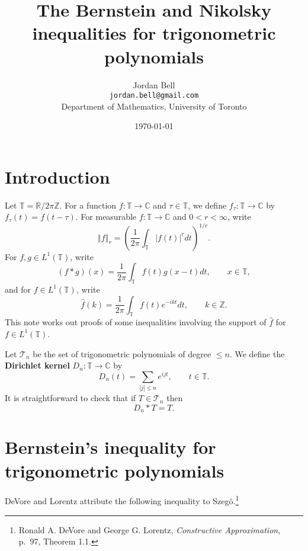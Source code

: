 \documentclass{article}
\newcommand{\norm}[1]{\left\Vert #1 \right\Vert}
\theoremstyle{definition}
\begin{document}
\title{The Bernstein and Nikolsky inequalities for trigonometric polynomials}
\author{Jordan Bell\\ \texttt{jordan.bell@gmail.com}\\Department of Mathematics, University of Toronto}
\date{\today}

\maketitle

\section{Introduction}
Let $\mathbb{T}=\mathbb{R}/2\pi \mathbb{Z}$. For a function $f:\mathbb{T} \to \mathbb{C}$ and $\tau \in \mathbb{T}$, we define
$f_\tau:\mathbb{T} \to \mathbb{C}$ by $f_\tau(t)=f(t-\tau)$.
For measurable $f:\mathbb{T} \to \mathbb{C}$ and $0<r<\infty$, write
\[
\norm{f}_r = \left(\frac{1}{2\pi} \int_{\mathbb{T}} |f(t)|^r dt\right)^{1/r}.
\]
For $f,g \in L^1(\mathbb{T})$, write
\[
(f*g)(x) = \frac{1}{2\pi} \int_{\mathbb{T}} f(t)g(x-t) dt, \qquad x \in \mathbb{T},
\]
and for $f \in L^1(\mathbb{T})$, write
\[
\hat{f}(k)=\frac{1}{2\pi} \int_{\mathbb{T}} f(t) e^{-ikt} dt, \qquad k \in \mathbb{Z}.
\]
This note works out proofs of some inequalities involving the support of  $\hat{f}$ for
$f \in L^1(\mathbb{T})$.



Let $\mathscr{T}_n$ be the set of trigonometric polynomials of degree $\leq n$. 
We define the \textbf{Dirichlet kernel} $D_n:\mathbb{T} \to \mathbb{C}$ by
\[
D_n(t) = \sum_{|j| \leq n} e^{ijt}, \qquad t \in \mathbb{T}.
\]
It is straightforward to check that if $T \in \mathscr{T}_n$ then 
\[
D_n * T = T.
\]



\section{Bernstein's inequality for trigonometric polynomials}
DeVore and Lorentz attribute the following inequality to Szeg\"o.\footnote{Ronald A. DeVore and George G. Lorentz,
{\em Constructive Approximation}, p.~97, Theorem 1.1.}
\end{document}
